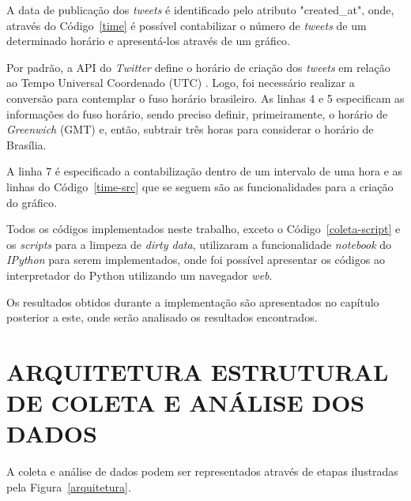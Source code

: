 

A data de publicação dos \textit{tweets} é identificado pelo atributo "created\_at", onde, através do Código~\ref{time} é possível contabilizar o número de \textit{tweets} de um determinado horário e apresentá-los através de um gráfico.

Por padrão, a API do \textit{Twitter} define o horário de criação dos \textit{tweets} em relação ao Tempo Universal Coordenado (UTC) \cite{twitter-doc}. Logo, foi necessário realizar a conversão para contemplar o fuso horário brasileiro. As linhas 4 e 5 especificam as informações do fuso horário, sendo preciso definir, primeiramente, o horário de \textit{Greenwich} (GMT) e, então, subtrair três horas para considerar o horário de Brasília.

A linha 7 é especificado a contabilização dentro de um intervalo de uma hora e as linhas do Código~\ref{time-src} que se seguem são as funcionalidades para a criação do gráfico.



Todos os códigos implementados neste trabalho, exceto o Código~\ref{coleta-script} e os \textit{scripts} para a limpeza de \textit{dirty data}, utilizaram a funcionalidade \textit{notebook} do \textit{IPython} para serem implementados, onde foi possível apresentar os códigos ao interpretador do Python utilizando um navegador \textit{web}.

Os resultados obtidos durante a implementação são apresentados no capítulo posterior a este, onde serão analisado os resultados encontrados.

\section{ARQUITETURA ESTRUTURAL DE COLETA E ANÁLISE DOS DADOS}
A coleta e análise de dados podem ser representados através de etapas ilustradas pela Figura~\ref{arquitetura}.

